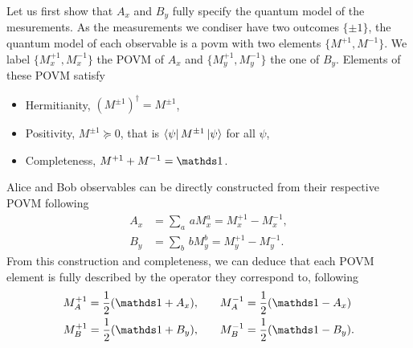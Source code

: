 Let us first show that $A_x$ and $B_y$ fully specify the quantum model of the mesurements.
As the measurements we condiser have two outcomes $\{\pm1\}$, the quantum model of each observable is a \acrfull{povm} with two elements $\{M^{+1},M^{-1}\}$. We label $\{M_x^{+1},M_x^{-1}\}$ the POVM of $A_x$ and $\{M_y^{+1},M_y^{-1}\}$ the one of $B_y$.
Elements of these POVM satisfy
\begin{itemize}
	\item Hermitianity, $(M^{\pm1})^\dag=M^{\pm1}$,
	\item Positivity, $M^{\pm1} \succeq 0$, that is $\bra{\psi}M^{\pm1}\ket{\psi}$ for all $\psi$,
	\item Completeness, $M^{+1}+M^{-1}=\id$.
\end{itemize}
Alice and Bob observables can be directly constructed from their respective POVM following
\begin{equation}
	\begin{split}
		A_x &= \sum_a \,a M^a_x = M^{+1}_x - M^{-1}_x, \\
		B_y &= \sum_b \,b M^b_y = M^{+1}_y - M^{-1}_y.
	\end{split}	
\end{equation}
From this construction and completeness, we can deduce that each POVM element is fully described by the operator they correspond to, following
\begin{equation}
	\begin{split}
		M^{+1}_A = \frac{1}{2}(\id+A_x),\qquad & M^{-1}_A = \frac{1}{2}(\id-A_x) \\
		M^{+1}_B = \frac{1}{2}(\id+B_y),\qquad & M^{-1}_B = \frac{1}{2}(\id-B_y).
	\end{split}
\end{equation}

\medbreak
	
